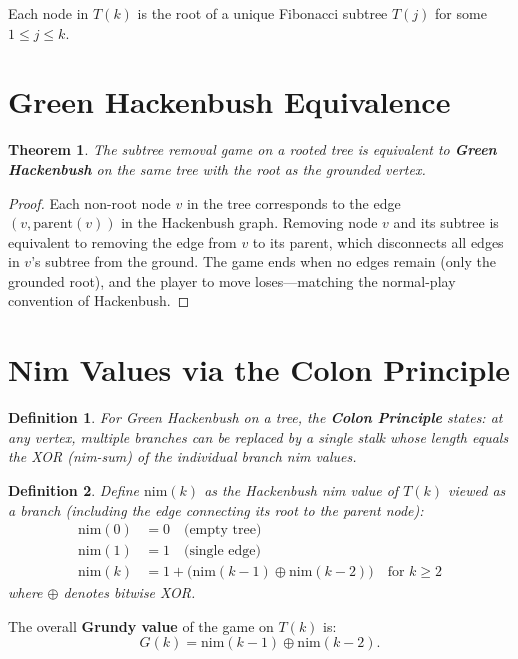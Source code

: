 \documentclass[11pt,a4paper]{article}
\newtheorem{theorem}{Theorem}
\newtheorem{definition}{Definition}
\begin{document}
Each node in $T(k)$ is the root of a unique Fibonacci subtree $T(j)$ for some $1 \leq j \leq k$.

\section{Green Hackenbush Equivalence}

\begin{theorem}
The subtree removal game on a rooted tree is equivalent to \textbf{Green Hackenbush} on the same tree with the root as the grounded vertex.
\end{theorem}

\begin{proof}
Each non-root node $v$ in the tree corresponds to the edge $(v, \mathrm{parent}(v))$ in the Hackenbush graph. Removing node $v$ and its subtree is equivalent to removing the edge from $v$ to its parent, which disconnects all edges in $v$'s subtree from the ground. The game ends when no edges remain (only the grounded root), and the player to move loses---matching the normal-play convention of Hackenbush.
\end{proof}

\section{Nim Values via the Colon Principle}

\begin{definition}
For Green Hackenbush on a tree, the \textbf{Colon Principle} states: at any vertex, multiple branches can be replaced by a single stalk whose length equals the XOR (nim-sum) of the individual branch nim values.
\end{definition}

\begin{definition}
Define $\mathrm{nim}(k)$ as the Hackenbush nim value of $T(k)$ viewed as a branch (including the edge connecting its root to the parent node):
\begin{align}
    \mathrm{nim}(0) &= 0 \quad \text{(empty tree)} \\
    \mathrm{nim}(1) &= 1 \quad \text{(single edge)} \\
    \mathrm{nim}(k) &= 1 + \bigl(\mathrm{nim}(k{-}1) \oplus \mathrm{nim}(k{-}2)\bigr) \quad \text{for } k \geq 2
\end{align}
where $\oplus$ denotes bitwise XOR.
\end{definition}

The overall \textbf{Grundy value} of the game on $T(k)$ is:
\[
    G(k) = \mathrm{nim}(k{-}1) \oplus \mathrm{nim}(k{-}2).
\]
\end{document}
